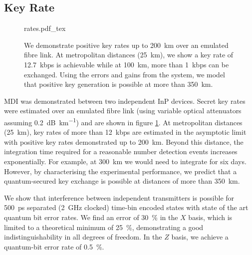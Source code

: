 %

\subsection{Key Rate}

\begin{figure}[tbp]
	\centering
	\small
	\def\svgwidth{0.9\textwidth} 
	{rates.pdf_tex}
	\caption[Asymptotic key rates of chip-based MDI-QKD]{We demonstrate positive key rates up to \SI{200}{\km} over an emulated fibre link. At metropolitan distances (\SI{25}{\km}), we show a key rate of \SI{12.7}{kbps} is achievable while at \SI{100}{\km}, more than \SI{1}{kbps} can be exchanged. Using the errors and gains from the system, we model that positive key generation is possible at more than \SI{350}{\km}.}
	\label{fig:mdi_rates}
\end{figure}

\Ac{MDI} was demonstrated between two independent InP devices. Secret key rates were estimated over an emulated fibre link (using variable optical attenuators assuming \SI{0.2}{dB\per\km}) and are shown in figure \ref{fig:mdi_rates}. At metropolitan distances (\SI{25}{\km}), key rates of more than \SI{12}{kbps} are estimated in the asymptotic limit with positive key rates demonstrated up to \SI{200}{\km}. Beyond this distance, the integration time required for a reasonable number detection events increases exponentially. For example, at \SI{300}{\km} we would need to integrate for six days. However, by characterising the experimental performance, we predict that a quantum-secured key exchange is possible at distances of more than \SI{350}{\km}. 

We show that interference between independent transmitters is possible for \SI{500}{ps} separated (\SI{2}{GHz} clocked) time-bin encoded states with state of the art quantum bit error rates. We find an error of \SI{30}{\percent} in the $X$ basis, which is limited to a theoretical minimum of \SI{25}{\percent}, demonstrating a good indistinguishability in all degrees of freedom. In the $Z$ basis, we achieve a quantum-bit error rate of \SI{0.5}{\percent}. 

